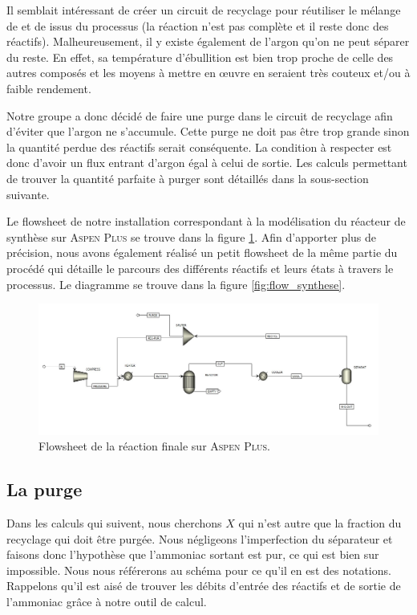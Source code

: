 \documentclass[a4paper, oneside, 12pt]{article}
\begin{document}
Il semblait intéressant de créer un circuit de recyclage pour réutiliser 
le mélange de  et de  issus du processus (la réaction n'est pas complète 
et il reste donc des réactifs). Malheureusement, il y existe également de l'argon 
qu'on ne peut séparer du reste. En effet, sa température d'ébullition est bien trop 
proche de celle des autres composés et les moyens à mettre en œuvre en seraient 
très couteux et/ou à faible rendement.

Notre groupe a donc décidé de faire une purge dans le circuit de recyclage afin d'éviter que l'argon ne s'accumule. Cette purge ne doit pas être trop grande sinon la quantité perdue des réactifs serait conséquente. 
La condition à respecter est donc d'avoir un flux entrant d'argon égal à celui de sortie. 
Les calculs permettant de trouver la quantité parfaite à purger 
sont détaillés dans la sous-section suivante.

Le flowsheet de notre installation correspondant à la modélisation 
du réacteur de synthèse sur \textsc{Aspen Plus} 
se trouve dans la figure \ref{fig:flow_aspen}.
Afin d'apporter plus de précision, nous avons également réalisé un petit 
flowsheet de la même partie du procédé qui détaille le parcours des 
différents réactifs et leurs états à travers le processus.
Le diagramme se trouve dans la figure \ref{fig:flow_synthese}.

\begin{figure}[h!]
	\begin{center}
		\includegraphics[scale=0.45,angle=90]{img_aspen/flowsheet.jpg}
	\end{center}
	\caption{Flowsheet de la réaction finale sur \textsc{Aspen Plus}.}
	\label{fig:flow_aspen}
\end{figure}

\subsection{La purge}

Dans les calculs qui suivent, nous cherchons $X$ qui n'est autre que 
la fraction du recyclage qui doit être purgée. 
Nous négligeons l'imperfection du séparateur et faisons donc l'hypothèse 
que l'ammoniac sortant est pur, ce qui est bien sur impossible. 
Nous nous référerons au schéma pour ce qu'il en est des notations. 
Rappelons qu'il est aisé de trouver les débits d'entrée des réactifs 
et de sortie de l'ammoniac grâce à notre outil de calcul.
\end{document}

